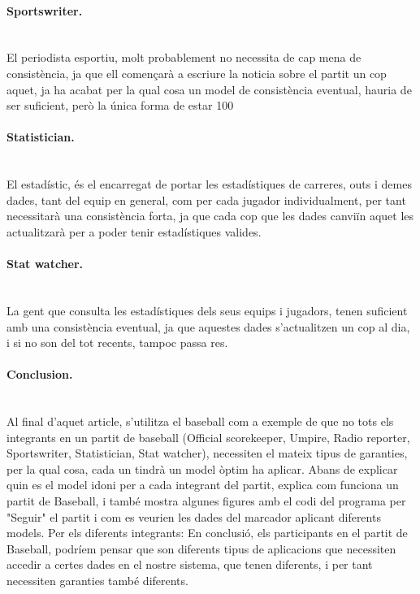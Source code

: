 \documentclass[a4paper, 10pt]{article}
\begin{document}
\paragraph{Sportswriter.\\\\}
El periodista esportiu, molt probablement no necessita de cap mena de consistència, ja que ell començarà a escriure la noticia sobre el partit un cop aquet, ja ha acabat per la qual cosa un model de consistència eventual, hauria de ser suficient, però la única forma de estar 100%
\paragraph{Statistician.\\\\}
El estadístic, és el encarregat de portar les estadístiques de carreres, outs i demes dades, tant del equip en general, com per cada jugador individualment, per tant necessitarà una consistència forta, ja que cada cop que les dades canviïn aquet les actualitzarà per a poder tenir estadístiques valides.

\paragraph{Stat watcher.\\\\}
La gent que consulta les estadístiques dels seus equips i jugadors, tenen suficient amb una consistència eventual, ja que aquestes dades s’actualitzen un cop al dia, i si no son del tot recents, tampoc passa res.
\newpage\paragraph{Conclusion.\\\\}
Al final d'aquet article, s'utilitza el baseball com a exemple de que no tots els integrants en un partit de baseball (Official scorekeeper, Umpire, Radio reporter, Sportswriter, Statistician, Stat watcher), necessiten el mateix tipus de garanties, per la qual cosa, cada un tindrà un model òptim ha aplicar.
Abans de explicar quin es el model idoni per a cada integrant del partit, explica com funciona un partit de Baseball, i també mostra algunes figures amb el codi del programa per "Seguir" el partit i com es veurien les dades del marcador aplicant diferents models.
Per els diferents integrants:
En conclusió, els participants en el partit de Baseball, podríem pensar que son diferents tipus de aplicacions que necessiten accedir a certes dades en el nostre sistema, que tenen diferents, i per tant necessiten garanties també diferents.
\end{document}
